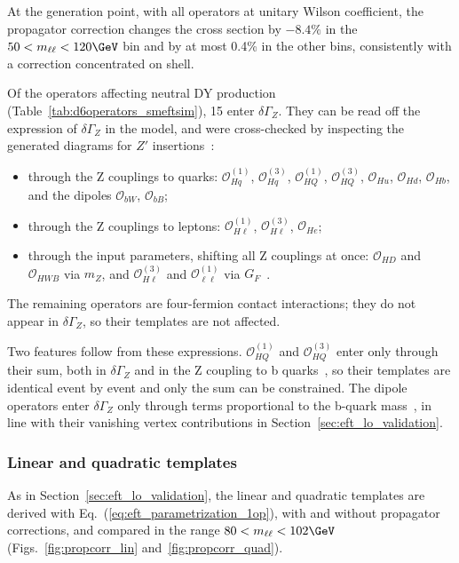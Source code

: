 At the generation point, with all operators at unitary Wilson coefficient, the
propagator correction changes the cross section by $-8.4\%$ in the
$50 < m_{\ell\ell} < 120\GeV$ bin and by at most 0.4\% in the other bins,
consistently with a correction concentrated on shell.

Of the operators affecting neutral DY production
(Table~\ref{tab:d6operators_smeftsim}),
15 enter $\delta\Gamma_Z$. They can be read off the expression of
$\delta\Gamma_Z$ in the model, and were cross-checked by inspecting the generated
diagrams for $Z'$ insertions~\cite{EFT2Obs}:
\begin{itemize}
  \item through the Z couplings to quarks: $\mathcal{O}_{Hq}^{(1)}$,
    $\mathcal{O}_{Hq}^{(3)}$, $\mathcal{O}_{HQ}^{(1)}$, $\mathcal{O}_{HQ}^{(3)}$,
    $\mathcal{O}_{Hu}$, $\mathcal{O}_{Hd}$, $\mathcal{O}_{Hb}$, and the dipoles
    $\mathcal{O}_{bW}$, $\mathcal{O}_{bB}$;
  \item through the Z couplings to leptons: $\mathcal{O}_{H\ell}^{(1)}$,
    $\mathcal{O}_{H\ell}^{(3)}$, $\mathcal{O}_{He}$;
  \item through the input parameters, shifting all Z couplings at once:
    $\mathcal{O}_{HD}$ and $\mathcal{O}_{HWB}$ via $m_Z$, and
    $\mathcal{O}_{H\ell}^{(3)}$ and $\mathcal{O}_{\ell\ell}^{(1)}$ via
    $G_F$~\cite[Table~4]{Brivio:2020onw}.
\end{itemize}
The remaining operators are four-fermion contact interactions; they do not
appear in $\delta\Gamma_Z$, so their templates are not affected.

Two features follow from these expressions. $\mathcal{O}_{HQ}^{(1)}$ and
$\mathcal{O}_{HQ}^{(3)}$ enter only through their sum, both in $\delta\Gamma_Z$ and
in the Z coupling to b quarks~\cite[Eq.~(A.5)]{Brivio:2020onw}, so their templates
are identical event by event and only the sum can be constrained. The dipole
operators enter $\delta\Gamma_Z$ only through terms proportional to the b-quark
mass~\cite[Eq.~(A.12)]{Brivio:2020onw}, in line with their vanishing vertex
contributions in Section~\ref{sec:eft_lo_validation}.

\subsubsection{Linear and quadratic templates}

As in Section~\ref{sec:eft_lo_validation},
the linear and quadratic templates are derived with
Eq.~(\ref{eq:eft_parametrization_1op}),
with and without propagator corrections, and compared in the range
$80 < m_{\ell\ell} < 102\GeV$
(Figs.~\ref{fig:propcorr_lin} and~\ref{fig:propcorr_quad}).

